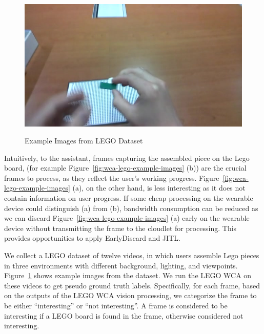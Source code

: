 \begin{figure}
\begin{minipage}[]{0.31\linewidth}
    \end{minipage}
    \begin{minipage}[]{0.31\linewidth}
        \centering
        \includegraphics[width=\linewidth]{FIGS/lego-dataset-3}\\
    \end{minipage}
    \caption{Example Images from LEGO Dataset}
    \label{fig:wca-lego-dataset}
\end{figure}

Intuitively, to the assistant, frames capturing the assembled piece on the Lego
board, (for example Figure~\ref{fig:wca-lego-example-images} (b)) are the
crucial frames to process, as they reflect the user's working progress.
Figure~\ref{fig:wca-lego-example-images} (a), on the other hand, is less
interesting as it does not contain information on user progress. If some cheap
processing on the wearable device could distinguish
(a) from (b), bandwidth consumption can be
reduced as we can discard Figure~\ref{fig:wca-lego-example-images} (a) early on
the wearable device without transmitting the frame to the cloudlet for processing.
This provides opportunities to apply EarlyDiscard and JITL.

We collect a LEGO dataset of twelve videos, in which users assemble Lego pieces
in three environments with different background, lighting, and viewpoints.
Figure~\ref{fig:wca-lego-dataset} shows example images from the dataset. We run
the LEGO WCA on these videos to get pseudo ground truth labels. Specifically,
for each frame, based on the outputs of the LEGO WCA vision processing, we
categorize the frame to be either ``interesting'' or ``not interesting''. A
frame is considered to be interesting if a LEGO board is found in the frame,
otherwise considered not interesting.

